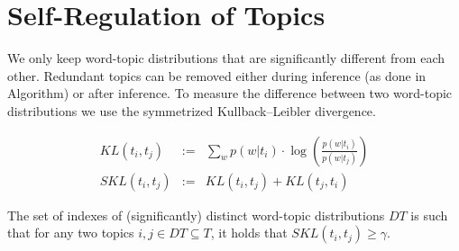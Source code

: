 \documentclass[twocolumn,10]{article}
\begin{document}
	\section{Self-Regulation of Topics}\label{sec:self}
	We only keep word-topic distributions that are significantly different from each other. Redundant topics can be removed either during inference (as done in Algorithm) or after inference.
	To measure the difference between two word-topic distributions we use the symmetrized Kullback--Leibler divergence.
	\begin{small}
		\begin{equation} \begin{aligned}
		KL(t_i,t_j)&:=& \sum_w p(w|t_i)\cdot \log( \frac{p(w|t_i)}{p(w|t_j)})\\
		SKL(t_i,t_j)&:=&KL(t_i,t_j)+KL(t_j,t_i) \label{eq:DT}
		\end{aligned}   \end{equation} 
	\end{small}
	The set of indexes of (significantly) distinct word-topic distributions $DT$ is such that for any two topics $i,j \in DT \subseteq T$, it holds that $SKL(t_i,t_j)\geq \gamma$. 
	
\end{document}
